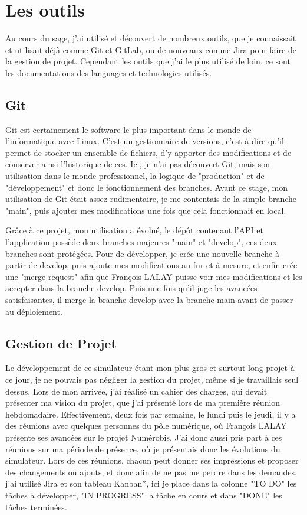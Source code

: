 \documentclass[a4paper,12pt]{report}
\begin{document}
\section{Les outils}
Au cours du sage, j'ai utilisé et découvert de nombreux outils, que je connaissait et utilisait déjà comme Git et GitLab, ou de nouveaux comme Jira pour faire de la gestion de projet. Cependant les outils que j'ai le plus utilisé de loin, ce sont les documentations des languages et technologies utilisés. 

\subsection{Git}
Git est certainement le software le plus important dans le monde de l'informatique avec Linux. C'est un gestionnaire de versions, c'est-à-dire qu'il permet de stocker un ensemble de fichiers, d'y apporter des modifications et de conserver ainsi l'historique de ces. Ici, je n'ai pas découvert Git, mais son utilisation dans le monde professionnel, la logique de "production" et de "développement" et donc le fonctionnement des branches. Avant ce stage, mon utilisation de Git était assez rudimentaire, je me contentais de la simple branche "main", puis ajouter mes modifications une fois que cela fonctionnait en local.


Grâce à ce projet, mon utilisation a évolué, le dépôt contenant l'API et l'application possède deux branches majeures "main" et "develop", ces deux branches sont protégées. Pour de développer, je crée une nouvelle branche à partir de develop, puis ajoute mes modifications au fur et à mesure, et enfin crée une "merge request" afin que François LALAY puisse voir mes modifications et les accepter dans la branche develop. Puis une fois qu'il juge les avancées satisfaisantes, il merge la branche develop avec la branche main avant de passer au déploiement.

\subsection{Gestion de Projet}
Le développement de ce simulateur étant mon plus gros et surtout long projet à ce jour, je ne pouvais pas négliger la gestion du projet, même si je travaillais seul dessus. Lors de mon arrivée, j'ai réalisé un cahier des charges, qui devait présenter ma vision du projet, que j'ai présenté lors de ma première réunion hebdomadaire. Effectivement, deux fois par semaine, le lundi puis le jeudi, il y a des réunions avec quelques personnes du pôle numérique, où François LALAY présente ses avancées sur le projet Numérobis. J'ai donc aussi pris part à ces réunions sur ma période de présence, où je présentais donc les évolutions du simulateur. Lors de ces réunions, chacun peut donner ses impressions et proposer des changements ou ajouts, et donc afin de ne pas me perdre dans les demandes, j'ai utilisé Jira et son tableau Kanban*, ici je place dans la colonne "TO DO" les tâches à développer, "IN PROGRESS" la tâche en cours et dans "DONE" les tâches terminées.
\end{document}
